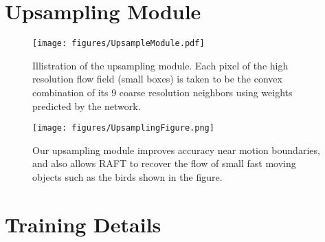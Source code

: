 \documentclass[runningheads]{llncs}
\begin{document}
\clearpage

\section{Upsampling Module}
\vspace{-5mm}

\begin{figure}[h!]
    \centering
	\texttt{[image: figures/UpsampleModule.pdf]}
	\caption{Illistration of the upsampling module. Each pixel of the high resolution flow field (small boxes) is taken to be the convex combination of its 9 coarse resolution neighbors using weights predicted by the network.}
	\label{fig:Convergence}
	\vspace{-6mm}
\end{figure}


\begin{figure}[h!]
	\vspace{-4mm}
	\texttt{[image: figures/UpsamplingFigure.png]}
	\caption{Our upsampling module improves accuracy near motion boundaries, and also allows RAFT to recover the flow of small fast moving objects such as the birds shown in the figure.}
	\label{fig:Upsampling}
	\vspace{-6mm}
\end{figure}



\section{Training Details}
\setlength\tabcolsep{.6em}
\begin{table}[]
\centering
{}
\vspace{2mm}
\caption{Details of the training schedule. Dataset abbreviations: C: FlyingChairs, T: FlyingThings, S: Sintel, K: KITTI-2015, H: HD1K. During the Sintel Finetuning phase, the dataset distribution is S(.71), T(.135), K(.135), H(.02).}
\label{table:ParamsAndTime}
\vspace{-3mm}
\end{table}
\end{document}
